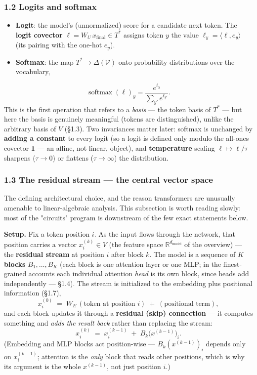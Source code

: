 \subsubsection*{1.2 Logits and softmax}
\begin{itemize}
\item \textbf{Logit}: the model's (unnormalized) score for a candidate next token. The \textbf{logit covector} $\ell = W_U\, x_{\text{final}} \in T^{*}$ assigns token $y$ the value $\ell_y = \langle \ell, e_y\rangle$ (its pairing with the one-hot $e_y$).
\item \textbf{Softmax}: the map $T^{*} \to \Delta(\mathcal V)$ onto probability distributions over the vocabulary,
\end{itemize}
\[ \operatorname{softmax}(\ell)_y = \frac{e^{\ell_y}}{\sum_{y'} e^{\ell_{y'}}}. \]   This is the first operation that refers to a \emph{basis} --- the token basis of $T^{*}$ --- but here the basis is genuinely meaningful (tokens are distinguished), unlike the arbitrary basis of $V$ (§1.3). Two invariances matter later: softmax is unchanged by \textbf{adding a constant} to every logit (so a logit is defined only modulo the all-ones covector $\mathbf 1$ --- an affine, not linear, object), and \textbf{temperature} scaling $\ell \mapsto \ell/\tau$ sharpens ($\tau\to 0$) or flattens ($\tau \to \infty$) the distribution.


\subsubsection*{1.3 The residual stream --- the central vector space}
The defining architectural choice, and the reason transformers are unusually amenable to linear-algebraic analysis. This subsection is worth reading slowly: most of the "circuits" program is downstream of the few exact statements below.


\textbf{Setup.} Fix a token position $i$. As the input flows through the network, that position carries a vector $x_i^{(k)} \in V$ (the feature space $\mathbb{R}^{d_{\text{model}}}$ of the overview) --- the \textbf{residual stream} at position $i$ after block $k$. The model is a sequence of $K$ \textbf{blocks} $B_1,\dots,B_K$ (each block is one attention layer or one MLP; in the finest-grained accounts each individual attention \emph{head} is its own block, since heads add independently --- §1.4). The stream is initialized to the embedding plus positional information (§1.7), \[ x_i^{(0)} \;=\; W_E\,(\text{token at position }i)\;+\;(\text{positional term}), \] and each block updates it through a \textbf{residual (skip) connection} --- it computes something and \emph{adds the result back} rather than replacing the stream: \[ x_i^{(k)} \;=\; x_i^{(k-1)} \;+\; B_k\!\big(x^{(k-1)}\big)_i. \] (Embedding and MLP blocks act position-wise --- $B_k(x^{(k-1)})_i$ depends only on $x_i^{(k-1)}$; attention is the \emph{only} block that reads other positions, which is why its argument is the whole $x^{(k-1)}$, not just position $i$.)


